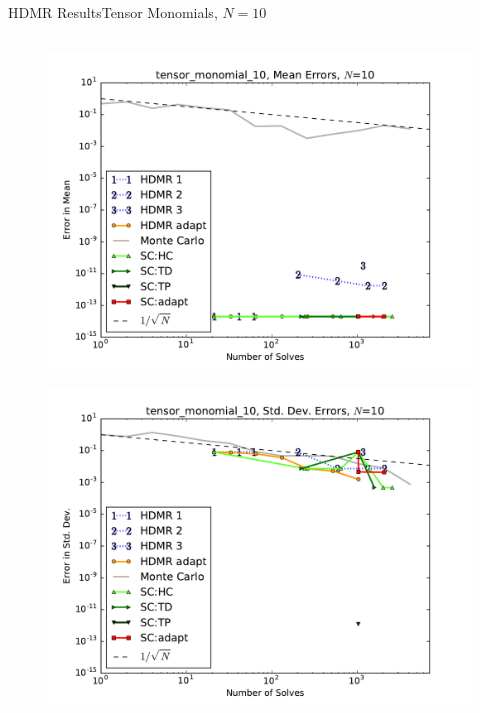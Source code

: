 \documentclass{beamer}
\begin{document}
\begin{frame}{HDMR Results}{Tensor Monomials, $N=10$}
\begin{columns}
\begin{column}{0.5\textwidth}
\begin{figure}[h!]
          \includegraphics[width=0.8\linewidth]{anlmodels/tensor_monomial_10_mean_errs}
        \end{figure}
        \vspace{-20pt}
        \begin{figure}[h!]
          \centering
          \includegraphics[width=0.8\linewidth]{anlmodels/tensor_monomial_10_variance_errs}
        \end{figure}
   \end{column}
 \end{columns}
\end{frame}
\end{document}
